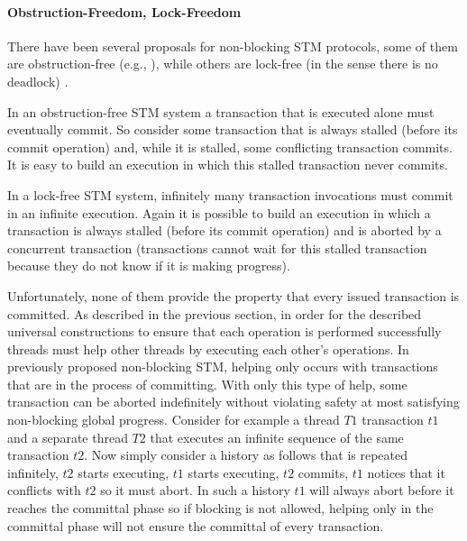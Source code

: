 \paragraph{Obstruction-Freedom, Lock-Freedom} 
There have been several proposals for non-blocking STM protocols,
some of them  are obstruction-free  (e.g., \cite{HLMS03,ST97}),
while others are lock-free  (in the sense there is no deadlock) \cite{GHS08}.

In an obstruction-free STM system a transaction that is executed alone 
must eventually commit. So consider some transaction that is always 
stalled (before its commit operation) and, while it is stalled, 
some conflicting transaction commits. It is easy to build an execution 
in which this stalled transaction never commits.

In a lock-free STM system, infinitely many transaction invocations must 
commit   in  an infinite  execution.  Again it  is  possible  to build   an
execution in which a transaction is always stalled  
(before its commit operation) and is aborted by a concurrent transaction  
(transactions cannot wait for this stalled transaction because they do not 
know if it is making progress).

Unfortunately, none of them  provide the property that every issued 
transaction is committed.
As described in the previous section,
in order for the described universal constructions to ensure that each operation
is performed successfully threads must help other threads by executing
each other's operations.
In previously proposed non-blocking STM, helping only occurs
with transactions that are in the process of committing.
With only this type of help,  some transaction 
can be aborted indefinitely without violating safety
at most satisfying non-blocking global progress.
Consider for example a thread $T1$ transaction $t1$
and a separate thread $T2$ that executes an infinite sequence of the
same transaction $t2$.
Now simply consider a history as follows that is repeated infinitely, $t2$ starts executing,
$t1$ starts executing, $t2$ commits, $t1$ notices that it conflicts with
$t2$ so it must abort.
In such a history $t1$ will always abort before it reaches the committal phase
so if blocking is not allowed, helping only in the committal phase will not
ensure the committal of every transaction.


